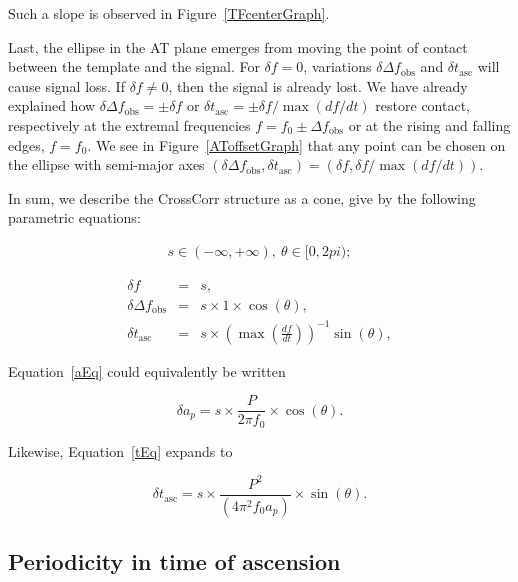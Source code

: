 \documentclass{article}
\begin{document}
\noindent Such a slope is observed in Figure~\ref{TFcenterGraph}.

Last, the ellipse in the AT plane emerges from moving the point of contact between the template and the signal.
For $\delta f = 0$, variations $\delta \Delta f_\mathrm{obs}$ and $\delta t_\mathrm{asc}$ will cause signal loss.
If $\delta f \neq 0$, then the signal is already lost.
We have already explained how $\delta \Delta f_\mathrm{obs} = \pm \delta f$ or $\delta t_\mathrm{asc} = \pm \delta f / \max (df/dt)$ restore contact, respectively at the extremal frequencies $f = f_0 \pm \Delta f_\mathrm{obs}$ or at the rising and falling edges, $f = f_0$.
We see in Figure~\ref{AToffsetGraph} that any point can be chosen on the ellipse with semi-major axes $(\delta \Delta f_\mathrm{obs}, \delta t_\mathrm{asc}) = (\delta f, \delta f/ \max (df /dt))$.

In sum, we describe the CrossCorr structure as a cone, give by the following parametric equations:

\begin{eqnarray}
s \in (-\infty, +\infty),~\theta \in [0, 2 pi);
\label{parametrics}
\end{eqnarray}

\begin{eqnarray}
\delta f                        &=& s, \label{fEq}\\
\delta \Delta f_\mathrm{obs} &=& s \times 1 \times \cos(\theta), \label{aEq}\\
\delta t_\mathrm{asc}                  &=& s \times \left(\max\left(\frac{df}{dt} \right)\right)^{-1} \sin(\theta) \label{tEq},
\end{eqnarray}

\noindent Equation~\ref{aEq} could equivalently be written

\begin{equation}
\delta a_p= s \times \frac{P}{2 \pi f_0} \times \cos(\theta).
\label{aEqFull}
\end{equation}

Likewise, Equation~\ref{tEq} expands to

\begin{equation}
\delta t_\mathrm{asc}    = s \times \frac{P^2}{(4 \pi^2 f_0 a_p)} \times \sin(\theta).
\label{tEqFull}
\end{equation}

\subsection{Periodicity in time of ascension}
\end{document}
